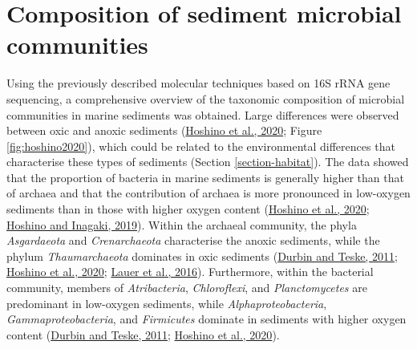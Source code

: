 \documentclass[
  12 pt,
]{book}
\begin{document}
\newpage

\hypertarget{section-composition}{%
\section{Composition of sediment microbial communities}\label{section-composition}}

Using the previously described molecular techniques based on 16S rRNA gene sequencing, a comprehensive overview of the taxonomic composition of microbial communities in marine sediments was obtained. Large differences were observed between oxic and anoxic sediments (\protect\hyperlink{ref-Hoshino2020}{Hoshino et al., 2020}; Figure \ref{fig:hoshino2020}), which could be related to the environmental differences that characterise these types of sediments (Section \ref{section-habitat}). The data showed that the proportion of bacteria in marine sediments is generally higher than that of archaea and that the contribution of archaea is more pronounced in low-oxygen sediments than in those with higher oxygen content (\protect\hyperlink{ref-Hoshino2020}{Hoshino et al., 2020}; \protect\hyperlink{ref-Hoshino2019}{Hoshino and Inagaki, 2019}). Within the archaeal community, the phyla \emph{Asgardaeota} and \emph{Crenarchaeota} characterise the anoxic sediments, while the phylum \emph{Thaumarchaeota} dominates in oxic sediments (\protect\hyperlink{ref-Durbin2011}{Durbin and Teske, 2011}; \protect\hyperlink{ref-Hoshino2020}{Hoshino et al., 2020}; \protect\hyperlink{ref-Lauer2016}{Lauer et al., 2016}). Furthermore, within the bacterial community, members of \emph{Atribacteria}, \emph{Chloroflexi}, and \emph{Planctomycetes} are predominant in low-oxygen sediments, while \emph{Alphaproteobacteria}, \emph{Gammaproteobacteria}, and \emph{Firmicutes} dominate in sediments with higher oxygen content (\protect\hyperlink{ref-Durbin2011}{Durbin and Teske, 2011}; \protect\hyperlink{ref-Hoshino2020}{Hoshino et al., 2020}).
\bigskip
\end{document}
